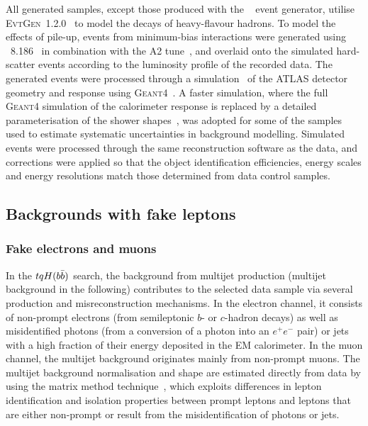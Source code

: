 All generated samples, except those produced with the {\sherpa}~\cite{Gleisberg:2008ta} event generator, 
utilise \textsc{EvtGen}~1.2.0~\cite{Lange:2001uf} to model the decays of heavy-flavour hadrons. 
To model the effects of pile-up, events from minimum-bias interactions were generated using {\pythia}~8.186~\cite{Sjostrand:2007gs}  
in combination with the A2 tune~\cite{ATL-PHYS-PUB-2011-014}, 
and overlaid onto the simulated hard-scatter events according to the luminosity profile of the recorded data. 
The generated events were processed through a simulation~\cite{Aad:2010ah} of the ATLAS detector geometry and response 
using \textsc{Geant4}~\cite{Agostinelli:2002hh}. A faster simulation, where the full \textsc{Geant4} simulation of
the calorimeter response is replaced by a detailed parameterisation of the shower shapes~\cite{FastCaloSim},
was adopted for some of the samples used to estimate systematic uncertainties in background modelling.
Simulated events were processed through the same reconstruction software as the data, and corrections were applied so that the object identification 
efficiencies, energy scales and energy resolutions match those determined from data control samples.

\subsection{Backgrounds with fake leptons}
\label{sec:fakeleptons}

\subsubsection{Fake electrons and muons}
In the $tqH(b\bar{b})$ search, the background from multijet production (multijet background in the following) contributes to the selected 
data sample via several production and misreconstruction mechanisms.  
In the electron channel, it consists of non-prompt electrons (from semileptonic $b$- or $c$-hadron decays) as well as 
misidentified photons (from a conversion of a photon into an $e^+e^-$ pair) or jets with a high fraction of 
their energy deposited in the EM calorimeter.  In the muon channel, the multijet background originates mainly from 
non-prompt muons.  The multijet background normalisation and shape are estimated directly from data by using the matrix method
technique~\cite{Aad:2010ey,ATLAS-CONF-2014-058}, which exploits differences in lepton identification and isolation properties between 
prompt leptons and leptons that are either non-prompt or result from the misidentification of photons or jets. 

